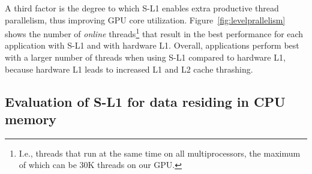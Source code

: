 A third factor is the degree to which S-L1 enables extra productive thread parallelism, thus improving GPU core utilization.
Figure~\ref{fig:levelprallelism} shows the number of \emph{online} threads\footnote{
    I.e., threads that run at the same time on all multiprocessors, the maximum of which can be 30K threads on our GPU.}
that result in the best performance for each application with S-L1 and with hardware L1.
Overall, applications perform best with a larger number of threads when using S-L1 compared to hardware L1,
because hardware L1 leads to increased L1 and L2 cache thrashing. 






\subsection{Evaluation of S-L1 for data residing in CPU memory}

